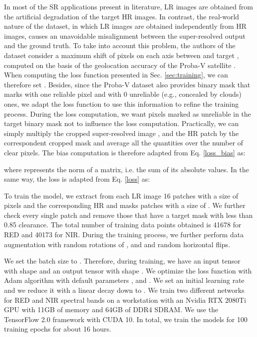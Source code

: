 \documentclass[journal]{IEEEtran}
\begin{document}
In most of the SR applications present in literature, LR images are obtained from the artificial degradation of the target HR images. In contrast, the real-world nature of the dataset, in which LR images are obtained independently from HR images, causes an unavoidable misalignment between the super-resolved output and the ground truth. To take into account this problem, the authors of the dataset consider a maximum shift of  pixels on each axis between  and target , computed on the basis of the geolocation accuracy of the Proba-V satellite \cite{martens2019super}. When computing the loss function presented in Sec. \ref{sec:training}, we can therefore set . Besides, since the Proba-V dataset also provides binary mask that marks with one reliable pixel and with 0 unreliable (e.g., concealed by clouds) ones, we adapt the loss function to use this information to refine the training process.  During the loss computation, we want pixels marked as unreliable in the target binary mask  not to influence the loss computation. Practically, we can simply multiply the cropped super-resolved image , and the HR patch  by the correspondent cropped mask  and average all the quantities over the number of clear pixels. The bias computation is therefore adapted from Eq. \ref{loss_bias} as:



\noindent where  represents the  norm of a matrix, i.e. the sum of its  absolute values. In the same way, the loss is adapted from Eq. \ref{loss} as:



To train the model, we extract from each LR image 16 patches with a size of  pixels and the corresponding HR and masks patches with a size of . We further check every single patch and remove those that have a target mask  with less than 0.85 clearance. The total number of training data points obtained is 41678 for RED and 40173 for NIR. During the training process, we further perform data augmentation with random rotations of ,  and  and random horizontal flips.

We set the batch size to . Therefore, during training, we have an input tensor with shape  and an output tensor with shape . We optimize the loss function with Adam algorithm \cite{kingma2014adam} with default parameters ,  and . We set an initial learning rate 
 and we reduce it with a linear decay down to . We train two different networks for RED and NIR spectral bands on a workstation with an Nvidia RTX 2080Ti GPU with 11GB of memory and 64GB of DDR4 SDRAM. We use the TensorFlow 2.0 framework with CUDA 10. In total, we train the models for 100 training epochs for about 16 hours.
\end{document}

